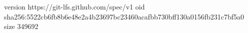 version https://git-lfs.github.com/spec/v1
oid sha256:5522cb6fb8b6e48e2a4b23697bc23460acafbb730bff130a0156fb231c7bf5a0
size 349692
